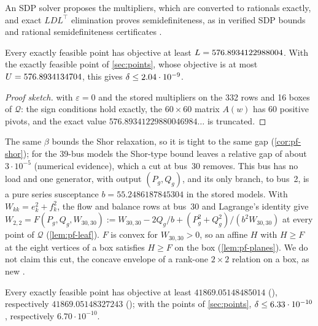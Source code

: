 An SDP solver proposes the multipliers, which are converted to rationals exactly, and exact $LDL^\top$ elimination proves semidefiniteness, as in verified SDP bounds \citep{jansson2007-rigorous-error-bounds-for-the,oustry2022-certified-and-accurate-sdp-bounds} and rational semidefiniteness certificates \citep{peyrl2008-computing-sum-of-squares-decompositions}.

\begin{theorem}\label{thm:pf-0030p}
Every exactly feasible point has objective at least $L=576.8934122988004$.
With the exactly feasible point of \cref{sec:points}, whose objective is at most $U=576.8934134704$, this gives $\delta\le2.04\cdot10^{-9}$.
\end{theorem}

\begin{proof}[Proof sketch]
 with $\varepsilon=0$ and the stored multipliers on the 332 rows and 16 boxes of $\mathcal Q$: the sign conditions hold exactly, the $60\times60$ matrix $A(w)$ has 60 positive pivots, and the exact value $576.89341229880046984\ldots$ is truncated.
\end{proof}

The same $\beta$ bounds the Shor relaxation, so it is tight to the same gap (\cref{cor:pf-shor}); for the 39-bus models the Shor-type bound leaves a relative gap of about $3\cdot10^{-5}$ (numerical evidence), which a cut at bus~30 removes.
This bus has no load and one generator, with output $(P_g,Q_g)$, and its only branch, to bus~2, is a pure series susceptance $b=55.2486187845304$ in the stored models.
With $W_{kk}=e_k^2+f_k^2$, the flow and balance rows at bus~30 and Lagrange's identity give $W_{2,2}=F(P_g,Q_g,W_{30,30}):=W_{30,30}-2Q_g/b+(P_g^2+Q_g^2)/(b^2W_{30,30})$ at every point of $\mathcal Q$ (\cref{lem:pf-leaf}).
$F$ is convex for $W_{30,30}>0$, so an affine $H$ with $H\ge F$ at the eight vertices of a box satisfies $H\ge F$ on the box (\cref{lem:pf-planes}).
We do not claim this cut, the concave envelope of a rank-one $2\times2$ relation on a box, as new \citep[compare][]{chen2016-a-spatial-branch-and-cut}.

\begin{theorem}\label{thm:pf-0039}
Every exactly feasible point has objective at least $41869.05148485014$ (), respectively $41869.05148327243$ (); with the points of \cref{sec:points}, $\delta\le6.33\cdot10^{-10}$, respectively $6.70\cdot10^{-10}$.
\end{theorem}

